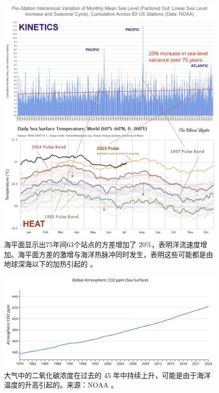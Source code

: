 \documentclass[10pt,twocolumn,letterpaper]{article}
\begin{document}
\begin{figure}[t]
\begin{center}
\includegraphics[width=1\textwidth]{sealevel.jpeg}
\end{center}
   \caption{海平面显示出75年间63个站点的方差增加了 20\%，表明洋流速度增加。海平面方差的激增与海洋热脉冲同时发生，表明这些可能都是由地球深海以下的加热引起的 \cite{2,129}。}
\label{fig:22}
\end{figure}
\begin{figure}[t]
\begin{center}
\includegraphics[width=1\textwidth]{co2.jpg}
\end{center}
   \caption{大气中的二氧化碳浓度在过去的 45 年中持续上升，可能是由于海洋温度的升高引起的。来源：NOAA \cite{148,129}。}
\label{fig:23}
\end{figure}
\end{document}
